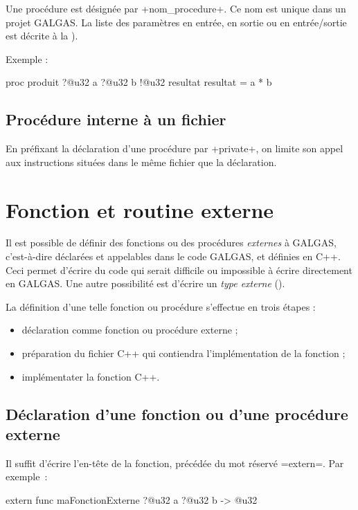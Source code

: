Une procédure est désignée par \ggsq+nom_procedure+. Ce nom est unique dans un projet GALGAS. La liste des paramètres en entrée, en sortie ou en entrée/sortie est décrite à la ).

Exemple :

\begin{galgas4}
proc produit ?@u32 a ?@u32 b !@u32 resultat {
  resultat = a * b
}
\end{galgas4}



\subsection{Procédure interne à un fichier}

En préfixant la déclaration d'une procédure par \ggsq+private+, on limite son appel aux instructions situées dans le même fichier que la déclaration.







\section{Fonction et routine externe}

Il est possible de définir des fonctions ou des procédures \emph{externes} à GALGAS, c'est-à-dire déclarées et appelables dans le code GALGAS, et définies en C++. Ceci permet d'écrire du code qui serait difficile ou impossible à écrire directement en GALGAS. Une autre possibilité est d'écrire un \emph{type externe} ().

La définition d'une telle fonction ou procédure s'effectue en trois étapes :
\begin{itemize}
  \item déclaration comme fonction ou procédure externe ;
  \item préparation du fichier C++ qui contiendra l'implémentation de la fonction ;
  \item implémentater la fonction C++.
\end{itemize}

\subsection{Déclaration d'une fonction ou d'une procédure externe}

Il suffit d'écrire l'en-tête de la fonction, précédée du mot réservé \ggsq=extern=. Par exemple~:
\begin{galgas4}
extern func maFonctionExterne ?@u32 a ?@u32 b -> @u32
\end{galgas4}

